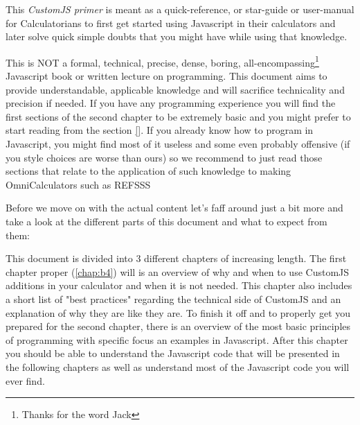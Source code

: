 \documentclass[11pt,a4paper,oldfontcommands]{memoir}
\begin{document}
This \textit{CustomJS primer} is meant as a quick-reference, or star-guide or user-manual for Calculatorians to first get started using Javascript in their calculators and later solve quick simple doubts that you might have while using that knowledge.

This is NOT a formal, technical, precise, dense, boring, all-encompassing\footnote{Thanks for the word Jack} Javascript book or written lecture on programming. This document aims to provide understandable, applicable knowledge and will sacrifice technicality and precision if needed. 
If you have any programming experience you will find the first sections of the second chapter to be extremely basic and you might prefer to start reading from the section \ref{}{}. If you already know how to program in Javascript, you might find most of it useless and some even probably offensive (if you style choices are worse than ours) so we recommend to just read those sections that relate to the application of such knowledge to making OmniCalculators such as REFSSS

Before we move on with the actual content let's faff around just a bit more and take a look at the different parts of this document and what to expect from them:

\iffalse
\begin{itemize}
    \item Chapter 1.- \textbf{Before you start} 
        \subitem Section 1.1 - A brief description of that is CustomJS what it does and how and when to use it
        \subitem Section 1.2 - Quick overview of the functions specific to omni that don't exist in regular JS
        \subitem Section 1.3 - A \textit{Gepe-complete}\footnote{\textit{Gepe-complete} Refers to an item that's been deemed complete by Alvaro Diez} start guide to get you started in programming from scratch, plus some additions relevant to CustomJS at Omni
        \subitem Section 1.4 - A collection of \textit{rules} that we have in place at Omni and their reasons to exist
    \item Chapter 2.- \textbf{Okay so you are already coding...}
        \subitem Section 2.1 - Basic and advance use cases in Custom JS with strong focus on Omni functions
        \subitem Section 2.2 - How to prevent errors and what to do when they happen
        \subitem Section 2.3 - Style guide as agreed by most of Omni Calculatorians. Follow or be bullied.
\end{itemize}
\fi

This document is divided into 3 different chapters of increasing length. The first chapter proper (\ref{chap:b4}) will is an overview of why and when to use CustomJS additions in your calculator and when it is not needed. This chapter also includes a short list of "best practices" regarding the technical side of CustomJS and an explanation of why they are like they are. To finish it off and to properly get you prepared for the second chapter, there is an overview of the most basic principles of programming with specific focus an examples in Javascript. After this chapter you should be able to understand the Javascript code that will be presented in the following chapters as well as understand most of the Javascript code you will ever find.
\end{document}
